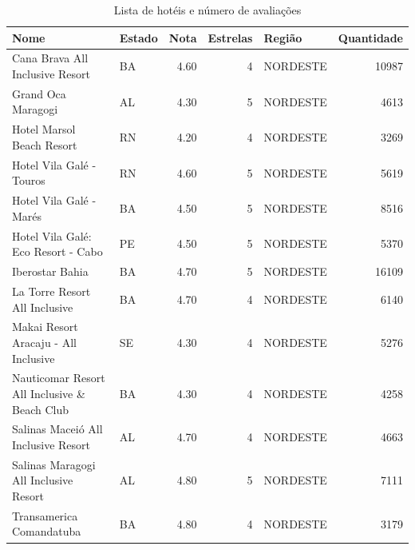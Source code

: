 \begin{table}[]
	\begin{tabular}{|p{5cm}|l|r|r|l|r|}
		\hline
		\textbf{Nome}                                 & \textbf{Estado} & \textbf{Nota} & \textbf{Estrelas} & \textbf{Região} & \textbf{Quantidade} \\\hline
		Cana Brava All Inclusive Resort               & BA              & 4.60          & 4                 & NORDESTE        & 10987               \\\hline
		Grand Oca Maragogi                            & AL              & 4.30          & 5                 & NORDESTE        & 4613                \\\hline
		Hotel Marsol Beach Resort                     & RN              & 4.20          & 4                 & NORDESTE        & 3269                \\\hline
		Hotel Vila Galé - Touros                      & RN              & 4.60          & 5                 & NORDESTE        & 5619                \\\hline
		Hotel Vila Galé - Marés                       & BA              & 4.50          & 5                 & NORDESTE        & 8516                \\\hline
		Hotel Vila Galé: Eco Resort - Cabo            & PE              & 4.50          & 5                 & NORDESTE        & 5370                \\\hline
		Iberostar Bahia                               & BA              & 4.70          & 5                 & NORDESTE        & 16109               \\\hline
		La Torre Resort All Inclusive                 & BA              & 4.70          & 4                 & NORDESTE        & 6140                \\\hline
		Makai Resort Aracaju - All Inclusive          & SE              & 4.30          & 4                 & NORDESTE        & 5276                \\\hline
		Nauticomar Resort All Inclusive \& Beach Club & BA              & 4.30          & 4                 & NORDESTE        & 4258                \\\hline
		Salinas Maceió All Inclusive Resort           & AL              & 4.70          & 4                 & NORDESTE        & 4663                \\\hline
		Salinas Maragogi All Inclusive Resort         & AL              & 4.80          & 5                 & NORDESTE        & 7111                \\\hline
		Transamerica Comandatuba                      & BA              & 4.80          & 4                 & NORDESTE        & 3179                \\\hline
	\end{tabular}%
	\caption{Lista de hotéis e número de avaliações}
	\label{table:lista_hoteis}
\end{table}

